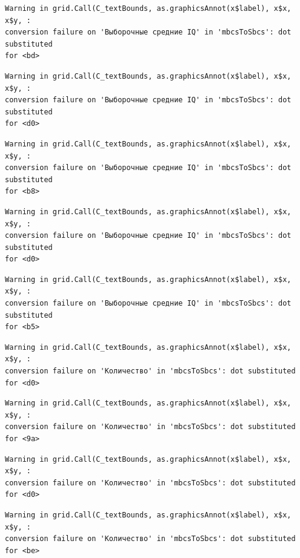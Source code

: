 \documentclass[
  letterpaper,
]{scrbook}
\theoremstyle{definition}
\theoremstyle{remark}
\begin{document}
\begin{verbatim}
Warning in grid.Call(C_textBounds, as.graphicsAnnot(x$label), x$x, x$y, :
conversion failure on 'Выборочные средние IQ' in 'mbcsToSbcs': dot substituted
for <bd>
\end{verbatim}

\begin{verbatim}
Warning in grid.Call(C_textBounds, as.graphicsAnnot(x$label), x$x, x$y, :
conversion failure on 'Выборочные средние IQ' in 'mbcsToSbcs': dot substituted
for <d0>
\end{verbatim}

\begin{verbatim}
Warning in grid.Call(C_textBounds, as.graphicsAnnot(x$label), x$x, x$y, :
conversion failure on 'Выборочные средние IQ' in 'mbcsToSbcs': dot substituted
for <b8>
\end{verbatim}

\begin{verbatim}
Warning in grid.Call(C_textBounds, as.graphicsAnnot(x$label), x$x, x$y, :
conversion failure on 'Выборочные средние IQ' in 'mbcsToSbcs': dot substituted
for <d0>
\end{verbatim}

\begin{verbatim}
Warning in grid.Call(C_textBounds, as.graphicsAnnot(x$label), x$x, x$y, :
conversion failure on 'Выборочные средние IQ' in 'mbcsToSbcs': dot substituted
for <b5>
\end{verbatim}

\begin{verbatim}
Warning in grid.Call(C_textBounds, as.graphicsAnnot(x$label), x$x, x$y, :
conversion failure on 'Количество' in 'mbcsToSbcs': dot substituted for <d0>
\end{verbatim}

\begin{verbatim}
Warning in grid.Call(C_textBounds, as.graphicsAnnot(x$label), x$x, x$y, :
conversion failure on 'Количество' in 'mbcsToSbcs': dot substituted for <9a>
\end{verbatim}

\begin{verbatim}
Warning in grid.Call(C_textBounds, as.graphicsAnnot(x$label), x$x, x$y, :
conversion failure on 'Количество' in 'mbcsToSbcs': dot substituted for <d0>
\end{verbatim}

\begin{verbatim}
Warning in grid.Call(C_textBounds, as.graphicsAnnot(x$label), x$x, x$y, :
conversion failure on 'Количество' in 'mbcsToSbcs': dot substituted for <be>
\end{verbatim}
\end{document}
